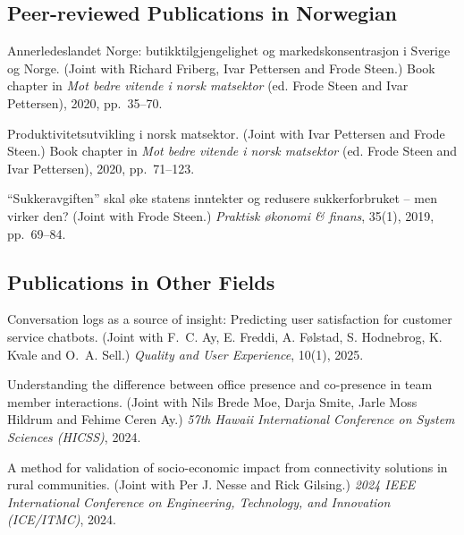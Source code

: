 \documentclass[10pt,a4paper]{article}
\begin{document}
\subsection*{Peer-reviewed Publications in Norwegian}

\begin{pubs}
  \item Annerledeslandet Norge: butikktilgjengelighet og markedskonsentrasjon i
        Sverige og Norge. (Joint with Richard Friberg, Ivar Pettersen and Frode
        Steen.) Book chapter in \emph{Mot bedre vitende i norsk matsektor}
        (ed. Frode Steen and Ivar Pettersen), 2020, pp.~35--70.

  \item Produktivitetsutvikling i norsk matsektor. (Joint with Ivar Pettersen
        and Frode Steen.) Book chapter in \emph{Mot bedre vitende i norsk
        matsektor} (ed. Frode Steen and Ivar Pettersen), 2020, pp.~71--123.

  \item ``Sukkeravgiften'' skal øke statens inntekter og redusere
        sukkerforbruket -- men virker den? (Joint with Frode Steen.)
        \emph{Praktisk økonomi \& finans}, 35(1), 2019, pp.~69--84.
\end{pubs}

\subsection*{Publications in Other Fields}

\begin{pubs}
  \item Conversation logs as a source of insight: Predicting user satisfaction
        for customer service chatbots. (Joint with F.~C. Ay, E. Freddi,
        A. Følstad, S. Hodnebrog, K. Kvale and O.~A. Sell.) \emph{Quality and
        User Experience}, 10(1), 2025.

  \item Understanding the difference between office presence and co-presence in
        team member interactions. (Joint with Nils Brede Moe, Darja Smite,
        Jarle Moss Hildrum and Fehime Ceren Ay.) \emph{57th Hawaii
        International Conference on System Sciences (HICSS)}, 2024.

  \item A method for validation of socio-economic impact from connectivity
        solutions in rural communities. (Joint with Per J. Nesse and Rick
        Gilsing.) \emph{2024 IEEE International Conference on Engineering,
        Technology, and Innovation (ICE/ITMC)}, 2024.
\end{pubs}
\end{document}
